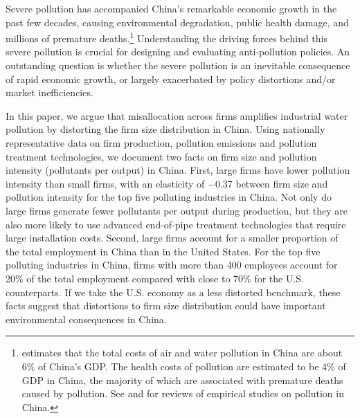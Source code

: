 \documentclass[AEJ]{AEA}
\begin{document}
\maketitle

Severe pollution has accompanied China's remarkable economic growth in the past few decades, causing environmental degradation, public health damage, and millions of premature deaths.\footnote{\citet{WorldBank_Cost_2007} estimates that the total costs of air and water pollution in China are about 6\% of China's GDP. The health costs of pollution are estimated to be 4\% of GDP in China, the majority of which are associated with premature deaths caused by pollution. See \citet{Vennemoetal:2009} and \citet{ZhengKahn:2013} for reviews of empirical studies on pollution in China.} Understanding the driving forces behind this severe pollution is crucial for designing and evaluating anti-pollution policies. An outstanding question is whether the severe pollution is an inevitable consequence of rapid economic growth, or largely exacerbated by policy distortions and/or market inefficiencies.

In this paper, we argue that misallocation across firms amplifies industrial water pollution by distorting the firm size distribution in China. Using nationally representative data on firm production, pollution emissions and pollution treatment technologies, we document two facts on firm size and pollution intensity (pollutants per output) in China. %
First, large firms have lower pollution intensity than small firms, with an elasticity of $-$0.37 between firm size and pollution intensity for the top five polluting industries in China. %
Not only do large firms generate  fewer pollutants per output during production, but they are also more likely to use advanced end-of-pipe treatment technologies that require large installation costs. Second, large firms account for a smaller proportion of the total employment in China than in the United States. For the top five polluting industries in China, firms with more than 400 employees account for 20\% of the total employment compared with close to 70\% for the U.S. counterparts. If we take the U.S. economy as a less distorted benchmark, these facts suggest that distortions to firm size distribution could have important environmental consequences in China.
\end{document}
